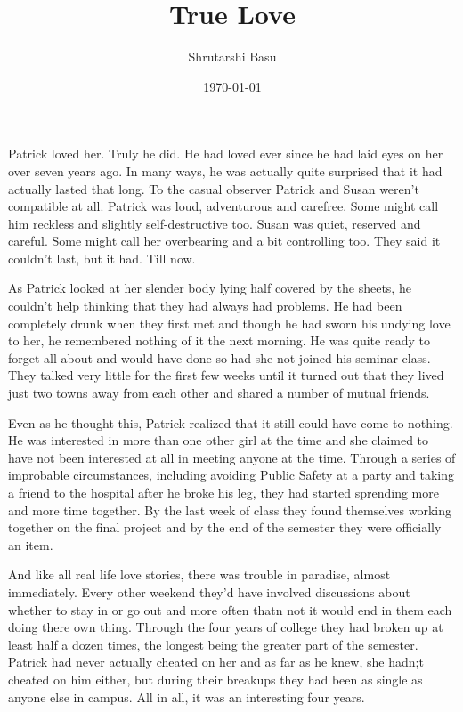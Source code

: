 \documentclass[11pt,letterpaper]{article}
\title{True Love}
\author{Shrutarshi Basu}
\date{\today}
\begin{document}
\maketitle
\doublespacing

Patrick loved her. Truly he did. He had loved ever since he had laid eyes on her over seven years ago. In many ways, he was actually quite surprised that it had actually lasted that long. To the casual observer Patrick and Susan weren't compatible at all. Patrick was loud, adventurous and carefree. Some might call him reckless and slightly self-destructive too. Susan was quiet, reserved and careful. Some might call her overbearing and a bit controlling too. They said it couldn't last, but it had. Till now.

As Patrick looked at her slender body lying half covered by the sheets, he couldn't help thinking that they had always had problems. He had been completely drunk when they first met and though he had sworn his undying love to her, he remembered nothing of it the next morning. He was quite ready to forget all about and would have done so had she not joined his seminar class. They talked very little for the first few weeks until it turned out that they lived just two towns away from each other and shared a number of mutual friends.

Even as he thought this, Patrick realized that it still could have come to nothing. He was interested in more than one other girl at the time and she claimed to have not been interested at all in meeting anyone at the time. Through a series of improbable circumstances, including avoiding Public Safety at a party and taking a friend to the hospital after he broke his leg, they had started sprending more and more time together. By the last week of class they found themselves working together on the final project and by the end of the semester they were officially an item.

And like all real life love stories, there was trouble in paradise, almost immediately. Every other weekend they'd have involved discussions about whether to stay in or go out and more often thatn not it would end in them each doing there own thing. Through the four years of college they had broken up at least half a dozen times, the longest being the greater part of the semester. Patrick had never actually cheated on her and as far as he knew, she hadn;t cheated on him either, but during their breakups they had been as single as anyone else in campus. All in all,  it was an interesting four years.
\end{document}
